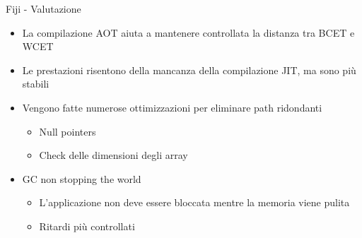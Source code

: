 \begin{frame}{Fiji - Valutazione}
	\begin{itemize}
		\item La compilazione AOT aiuta a mantenere controllata la distanza tra BCET e WCET
		\item Le prestazioni risentono della mancanza della compilazione JIT, ma sono più stabili
		\item Vengono fatte numerose ottimizzazioni per eliminare path ridondanti
		\begin{itemize}
			\item Null pointers
			\item Check delle dimensioni degli array
		\end{itemize}
		\item GC non stopping the world
		\begin{itemize}
			\item L'applicazione non deve essere bloccata mentre la memoria viene pulita
			\item Ritardi più controllati
		\end{itemize}
	\end{itemize}
\end{frame}